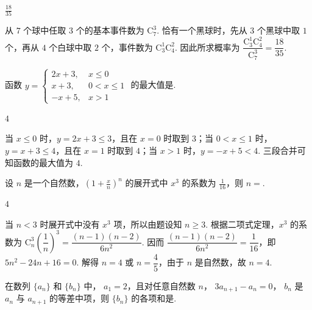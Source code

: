 \documentclass[UTF8,a4paper,oneside,11pt]{ctexbook}
\begin{document}
\begin{answer}
\(\frac{18}{35}\)
\end{answer}

\begin{solution}
从 \(7\) 个球中任取 \(3\) 个的基本事件数为 \(\mathrm C_7^3\). 恰有一个黑球时，先从 \(3\) 个黑球中取 \(1\) 个，再从 \(4\) 个白球中取 \(2\) 个，事件数为 \(\mathrm C_3^1\mathrm C_4^2\). 因此所求概率为 \(\dfrac{\mathrm C_3^1\mathrm C_4^2}{\mathrm C_7^3}=\dfrac{18}{35}\).
\end{solution}

\begin{problem}
函数 \(y=\begin{cases}
2x+3,&x\leqslant0\\
x+3,&0<x\leqslant1\\
-x+5,&x>1
\end{cases}\) 的最大值是\fillinblank{}.
\end{problem}

\begin{answer}
\(4\)
\end{answer}

\begin{solution}
当 \(x\leqslant0\) 时，\(y=2x+3\leqslant3\)，且在 \(x=0\) 时取到 \(3\)；当 \(0<x\leqslant1\) 时，\(y=x+3\leqslant4\)，且在 \(x=1\) 时取到 \(4\)；当 \(x>1\) 时，\(y=-x+5<4\). 三段合并可知函数的最大值为 \(4\).
\end{solution}

\begin{problem}
设 \(n\) 是一个自然数，\(\left(1+\frac{x}{n}\right)^{n} \) 的展开式中 \(x^{3} \) 的系数为 \(\frac{1}{16} \)，则 \(n=\)\fillinblank{}.
\end{problem}

\begin{answer}
\(4\)
\end{answer}

\begin{solution}
当 \(n<3\) 时展开式中没有 \(x^3\) 项，所以由题设知 \(n\geqslant3\). 根据二项式定理，\(x^3\) 的系数为 \(\mathrm C_n^3\left(\dfrac1n\right)^3=\dfrac{(n-1)(n-2)}{6n^2}\). 因而 \(\dfrac{(n-1)(n-2)}{6n^2}=\dfrac1{16}\)，即 \(5n^2-24n+16=0\). 解得 \(n=4\) 或 \(n=\dfrac45\)，由于 \(n\) 是自然数，故 \(n=4\).
\end{solution}

\begin{problem}
在数列 \(\{a_{n}\} \) 和 \(\{b_{n}\} \) 中， \(a_{1}=2 \)，且对任意自然数 \(n\)， \(3a_{n+1}-a_{n}=0 \)， \(b_{n} \) 是 \(a_{n} \) 与 \(a_{n+1} \) 的等差中项，则 \(\{b_{n}\} \) 的各项和是\fillinblank{}.
\end{problem}
\end{document}
